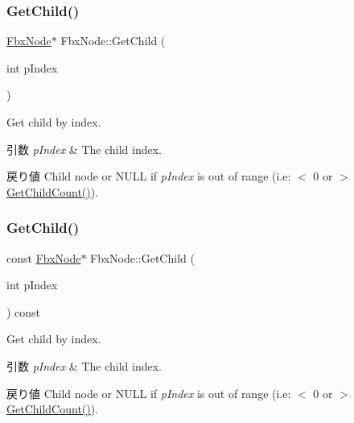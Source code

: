 \subsubsection{\texorpdfstring{Get\+Child()}{GetChild()}\hspace{0.1cm}{\footnotesize\ttfamily [1/2]}}
{\footnotesize\ttfamily \hyperlink{class_fbx_node}{Fbx\+Node}$\ast$ Fbx\+Node\+::\+Get\+Child (\begin{DoxyParamCaption}\item[{int}]{p\+Index }\end{DoxyParamCaption})}

Get child by index. 
\begin{DoxyParams}{引数}
{\em p\+Index} & The child index. \\
\hline
\end{DoxyParams}
\begin{DoxyReturn}{戻り値}
Child node or {\ttfamily N\+U\+LL} if {\itshape p\+Index} is out of range (i.\+e\+: $<$ 0 or $>$ \hyperlink{class_fbx_node_a25d388f54f8992b879c0f0c4320a9f71}{Get\+Child\+Count()}). 
\end{DoxyReturn}
\mbox{\label{class_fbx_node_a951e6c8550271e24fcbb8d6c00b418c0}} 
\subsubsection{\texorpdfstring{Get\+Child()}{GetChild()}\hspace{0.1cm}{\footnotesize\ttfamily [2/2]}}
{\footnotesize\ttfamily const \hyperlink{class_fbx_node}{Fbx\+Node}$\ast$ Fbx\+Node\+::\+Get\+Child (\begin{DoxyParamCaption}\item[{int}]{p\+Index }\end{DoxyParamCaption}) const}

Get child by index. 
\begin{DoxyParams}{引数}
{\em p\+Index} & The child index. \\
\hline
\end{DoxyParams}
\begin{DoxyReturn}{戻り値}
Child node or {\ttfamily N\+U\+LL} if {\itshape p\+Index} is out of range (i.\+e\+: $<$ 0 or $>$ \hyperlink{class_fbx_node_a25d388f54f8992b879c0f0c4320a9f71}{Get\+Child\+Count()}). 
\end{DoxyReturn}
\mbox{\label{class_fbx_node_a25d388f54f8992b879c0f0c4320a9f71}} 
